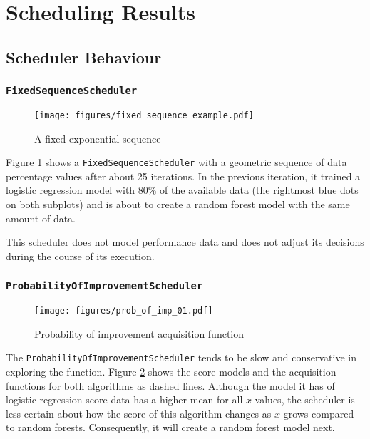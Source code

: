 \documentclass[a4paper,12pt,twoside,openright]{report}
\begin{document}
\section{Scheduling Results}

\subsection{Scheduler Behaviour}

\subsubsection{\texttt{FixedSequenceScheduler}}
\begin{figure}[h]
\centering
  \texttt{[image: figures/fixed\_sequence\_example.pdf]}
  \caption{A fixed exponential sequence}
  \label{fixedsequenceexample}
\end{figure}

Figure \ref{fixedsequenceexample} shows a \texttt{FixedSequenceScheduler} with a geometric sequence of data percentage values after about 25 iterations. In the previous iteration, it trained a logistic regression model with 80\% of the available data (the rightmost blue dots on both subplots) and is about to create a random forest model with the same amount of data.

This scheduler does not model performance data and does not adjust its decisions during the course of its execution.


\subsubsection{\texttt{ProbabilityOfImprovementScheduler}}
\begin{figure}[t]
\centering
  \texttt{[image: figures/prob\_of\_imp\_01.pdf]}
  \caption{Probability of improvement acquisition function}
  \label{sched:probofimpr1}
\end{figure}

The \texttt{ProbabilityOfImprovementScheduler} tends to be slow and conservative in exploring the function. Figure \ref{sched:probofimpr1} shows the score models and the acquisition functions for both algorithms as dashed lines. Although the model it has of logistic regression score data has a higher mean for all $x$ values, the scheduler is less certain about how the score of this algorithm changes as $x$ grows compared to random forests. Consequently, it will create a random forest model next.
\end{document}
